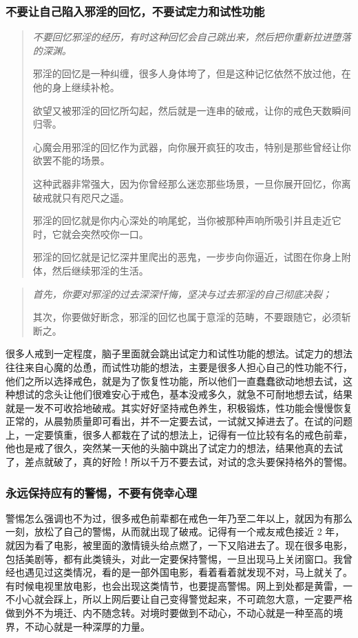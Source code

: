 \subsubsection{不要让自己陷入邪淫的回忆，不要试定力和试性功能}

\begin{quotation}\it
    不要回忆邪淫的经历，有时这种回忆会自己跳出来，然后把你重新拉进堕落的深渊。

    邪淫的回忆是一种纠缠，很多人身体垮了，但是这种记忆依然不放过他，在他的身上继续补枪。

    欲望又被邪淫的回忆所勾起，然后就是一连串的破戒，让你的戒色天数瞬间归零。

    心魔会用邪淫的回忆作为武器，向你展开疯狂的攻击，特别是那些曾经让你欲罢不能的场景。

    这种武器非常强大，因为你曾经那么迷恋那些场景，一旦你展开回忆，你离破戒就只有咫尺之遥。

    邪淫的回忆就是你内心深处的响尾蛇，当你被那种声响所吸引并且走近它时，它就会突然咬你一口。

    邪淫的回忆就是记忆深井里爬出的恶鬼，一步步向你逼近，试图在你身上附体，然后继续邪淫的生活。
\end{quotation}

\begin{quotation}\it
    首先，你要对邪淫的过去深深忏悔，坚决与过去邪淫的自己彻底决裂；

    其次，你要做好断念，邪淫的回忆也属于意淫的范畴，不要跟随它，必须斩断之。
\end{quotation}

很多人戒到一定程度，脑子里面就会跳出试定力和试性功能的想法。试定力的想法往往来自心魔的怂恿，而试性功能的想法，主要是很多人担心自己的性功能不行，他们之所以选择戒色，就是为了恢复性功能，所以他们一直蠢蠢欲动地想去试，这种想试的念头让他们很难安心于戒色，基本没戒多久，就急不可耐地想去试，结果就是一发不可收拾地破戒。其实好好坚持戒色养生，积极锻炼，性功能会慢慢恢复正常的，从晨勃质量即可看出，并不一定要去试，一试就又掉进去了。在试的问题上，一定要慎重，很多人都栽在了试的想法上，记得有一位比较有名的戒色前辈，他也是戒了很久，突然某一天他的头脑中跳出了试定力的想法，结果他真的去试了，差点就破了，真的好险！所以千万不要去试，对试的念头要保持格外的警惕。

\subsubsection{永远保持应有的警惕，不要有侥幸心理}

警惕怎么强调也不为过，很多戒色前辈都在戒色一年乃至二年以上，就因为有那么一刻，放松了自己的警惕，从而就出现了破戒。记得有一个戒友戒色接近 2 年，就因为看了电影，被里面的激情镜头给点燃了，一下又陷进去了。现在很多电影，包括美剧等，都有此类镜头，对此一定要保持警惕，一旦出现马上关闭窗口。我曾经也遇见过这类情况，看的是一部外国电影，看着看着就发现不对，马上就关了。有时候电视里放电影，也会出现这类情节，也要提高警惕。网上到处都是黄雷，一不小心就会踩上，所以上网后要让自己变得警觉起来，不可疏忽大意，一定要严格做到外不为境迁、内不随念转。对境时要做到不动心，不动心就是一种至高的境界，不动心就是一种深厚的力量。

